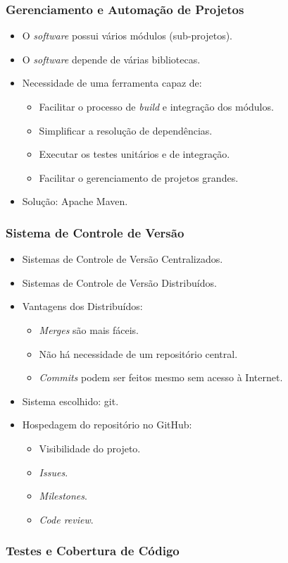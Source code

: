 \frame
{
\frametitle{Gerenciamento e Automação de Projetos}
	\begin{itemize}
		\item O \emph{software} possui vários módulos (sub-projetos).
		\item O \emph{software} depende de várias bibliotecas.
		\item Necessidade de uma ferramenta capaz de:
		\begin{itemize}
			\item Facilitar o processo de \emph{build} e integração dos módulos.
			\item Simplificar a resolução de dependências.
			\item Executar os testes unitários e de integração.
			\item Facilitar o gerenciamento de projetos grandes.
		\end{itemize}
		\item Solução: Apache Maven.
	\end{itemize}
}

\frame
{
\frametitle{Sistema de Controle de Versão}
	\begin{itemize}
		\item Sistemas de Controle de Versão Centralizados.
		\item Sistemas de Controle de Versão Distribuídos.
		\item Vantagens dos Distribuídos:
		\begin{itemize}
			\item \emph{Merges} são mais fáceis.
			\item Não há necessidade de um repositório central.
			\item \emph{Commits} podem ser feitos mesmo sem acesso à Internet.
		\end{itemize}
		\item Sistema escolhido: git.
		\item Hospedagem do repositório no GitHub{\textsuperscript\textregistered}:
		\begin{itemize}
			\item Visibilidade do projeto.
			\item \emph{Issues}.
			\item \emph{Milestones}.
			\item \emph{Code review}.
		\end{itemize}
	\end{itemize}
}

\frame
{
\frametitle{Testes e Cobertura de Código}
}
